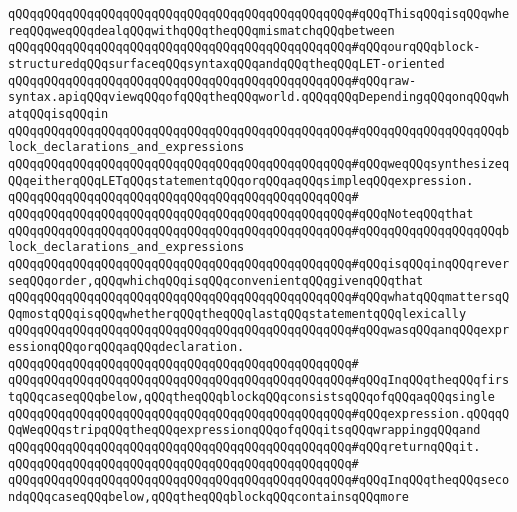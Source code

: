 \verb|qQQqqQQqqQQqqQQqqQQqqQQqqQQqqQQqqQQqqQQqqQQqqQQq#qQQqThisqQQqisqQQqwhereqQQqweqQQqdealqQQqwithqQQqtheqQQqmismatchqQQqbetween|\newline
\verb|qQQqqQQqqQQqqQQqqQQqqQQqqQQqqQQqqQQqqQQqqQQqqQQq#qQQqourqQQqblock-structuredqQQqsurfaceqQQqsyntaxqQQqandqQQqtheqQQqLET-oriented|\newline
\verb|qQQqqQQqqQQqqQQqqQQqqQQqqQQqqQQqqQQqqQQqqQQqqQQq#qQQqraw-syntax.apiqQQqviewqQQqofqQQqtheqQQqworld.qQQqqQQqDependingqQQqonqQQqwhatqQQqisqQQqin|\newline
\verb|qQQqqQQqqQQqqQQqqQQqqQQqqQQqqQQqqQQqqQQqqQQqqQQq#qQQqqQQqqQQqqQQqqQQqblock_declarations_and_expressions|\newline
\verb|qQQqqQQqqQQqqQQqqQQqqQQqqQQqqQQqqQQqqQQqqQQqqQQq#qQQqweqQQqsynthesizeqQQqeitherqQQqLETqQQqstatementqQQqorqQQqaqQQqsimpleqQQqexpression.|\newline
\verb|qQQqqQQqqQQqqQQqqQQqqQQqqQQqqQQqqQQqqQQqqQQqqQQq#|\newline
\verb|qQQqqQQqqQQqqQQqqQQqqQQqqQQqqQQqqQQqqQQqqQQqqQQq#qQQqNoteqQQqthat|\newline
\verb|qQQqqQQqqQQqqQQqqQQqqQQqqQQqqQQqqQQqqQQqqQQqqQQq#qQQqqQQqqQQqqQQqqQQqblock_declarations_and_expressions|\newline
\verb|qQQqqQQqqQQqqQQqqQQqqQQqqQQqqQQqqQQqqQQqqQQqqQQq#qQQqisqQQqinqQQqreverseqQQqorder,qQQqwhichqQQqisqQQqconvenientqQQqgivenqQQqthat|\newline
\verb|qQQqqQQqqQQqqQQqqQQqqQQqqQQqqQQqqQQqqQQqqQQqqQQq#qQQqwhatqQQqmattersqQQqmostqQQqisqQQqwhetherqQQqtheqQQqlastqQQqstatementqQQqlexically|\newline
\verb|qQQqqQQqqQQqqQQqqQQqqQQqqQQqqQQqqQQqqQQqqQQqqQQq#qQQqwasqQQqanqQQqexpressionqQQqorqQQqaqQQqdeclaration.|\newline
\verb|qQQqqQQqqQQqqQQqqQQqqQQqqQQqqQQqqQQqqQQqqQQqqQQq#|\newline
\verb|qQQqqQQqqQQqqQQqqQQqqQQqqQQqqQQqqQQqqQQqqQQqqQQq#qQQqInqQQqtheqQQqfirstqQQqcaseqQQqbelow,qQQqtheqQQqblockqQQqconsistsqQQqofqQQqaqQQqsingle|\newline
\verb|qQQqqQQqqQQqqQQqqQQqqQQqqQQqqQQqqQQqqQQqqQQqqQQq#qQQqexpression.qQQqqQQqWeqQQqstripqQQqtheqQQqexpressionqQQqofqQQqitsqQQqwrappingqQQqand|\newline
\verb|qQQqqQQqqQQqqQQqqQQqqQQqqQQqqQQqqQQqqQQqqQQqqQQq#qQQqreturnqQQqit.|\newline
\verb|qQQqqQQqqQQqqQQqqQQqqQQqqQQqqQQqqQQqqQQqqQQqqQQq#|\newline
\verb|qQQqqQQqqQQqqQQqqQQqqQQqqQQqqQQqqQQqqQQqqQQqqQQq#qQQqInqQQqtheqQQqsecondqQQqcaseqQQqbelow,qQQqtheqQQqblockqQQqcontainsqQQqmore|\newline
